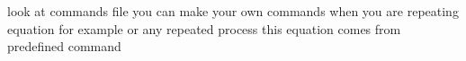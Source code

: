 look at commands file you can make your own commands when you are repeating equation for example or any repeated process 
this equation comes from predefined command
\komyCommand